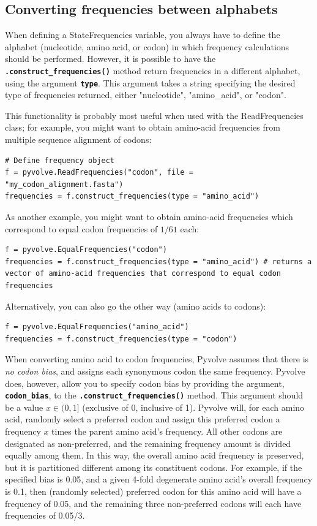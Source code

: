 \documentclass{article}
\newcommand{\code}[1]{\textbf{\texttt{\small{#1}}}}
\begin{document}
\subsection{Converting frequencies between alphabets}

When defining a StateFrequencies variable, you always have to define the alphabet (nucleotide, amino acid, or codon) in which frequency calculations should be performed. However, it is possible to have the \code{.construct\_frequencies()} method return frequencies in a different alphabet, using the argument \code{type}. This argument takes a string specifying the desired type of frequencies returned, either "nucleotide", "amino\_acid", or "codon".

This functionality is probably most useful when used with the ReadFrequencies class; for example, you might want to obtain amino-acid frequencies from multiple sequence alignment of codons:
\begin{lstlisting}
# Define frequency object
f = pyvolve.ReadFrequencies("codon", file = "my_codon_alignment.fasta")
frequencies = f.construct_frequencies(type = "amino_acid")
\end{lstlisting}

As another example, you might want to obtain amino-acid frequencies which correspond to equal codon frequencies of $1/61$ each:
\begin{lstlisting}
f = pyvolve.EqualFrequencies("codon")
frequencies = f.construct_frequencies(type = "amino_acid") # returns a vector of amino-acid frequencies that correspond to equal codon frequencies
\end{lstlisting}

Alternatively, you can also go the other way (amino acids to codons):
\begin{lstlisting}
f = pyvolve.EqualFrequencies("amino_acid")
frequencies = f.construct_frequencies(type = "codon")
\end{lstlisting}
When converting amino acid to codon frequencies, Pyvolve assumes that there is \emph{no codon bias}, and assigns each synonymous codon the same frequency. Pyvolve does, however, allow you to specify codon bias by providing the argument, \code{codon\_bias}, to the \code{.construct\_frequencies()} method. This argument should be a value $x \in (0, 1]$ (exclusive of 0, inclusive of 1). Pyvolve will, for each amino acid, randomly select a preferred codon and assign this preferred codon a frequency $x$ times the parent amino acid's frequency. All other codons are designated as non-preferred, and the remaining frequency amount is divided equally among them. In this way, the overall amino acid frequency is preserved, but it is partitioned different among its constituent codons. For example, if the specified bias is 0.05, and a given 4-fold degenerate amino acid's overall frequency is 0.1, then (randomly selected) preferred codon for this amino acid will have a frequency of 0.05, and the remaining three non-preferred codons will each have frequencies of 0.05/3.
\end{document}
